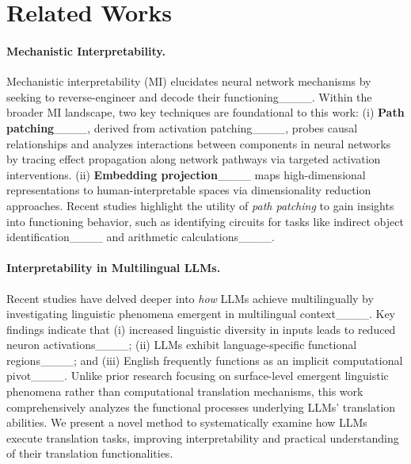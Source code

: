 \section{Related Works}
\paragraph{Mechanistic Interpretability.}
Mechanistic interpretability (MI) elucidates neural network mechanisms by seeking to reverse-engineer and decode their functioning____.
Within the broader MI landscape, two key techniques are foundational to this work: (i) \textbf{Path patching}____, derived from activation patching____, probes causal relationships and analyzes interactions between components in neural networks by tracing effect propagation along network pathways via targeted activation interventions.
(ii) \textbf{Embedding projection}____ maps high-dimensional representations to human-interpretable spaces via dimensionality reduction approaches. 
Recent studies highlight the utility of \textit{path patching} to gain insights into functioning behavior, such as identifying circuits for tasks like indirect object identification____ and arithmetic calculations____.


\paragraph{Interpretability in Multilingual LLMs.}

Recent studies have delved deeper into \textit{how} LLMs achieve multilingually by investigating linguistic phenomena emergent in multilingual context____. Key findings indicate that (i) increased linguistic diversity in inputs leads to reduced neuron activations____; (ii) LLMs exhibit language-specific functional regions____; and (iii) English frequently functions as an implicit computational pivot____. 
Unlike prior research focusing on surface-level emergent linguistic phenomena rather than computational translation mechanisms, this work comprehensively analyzes the functional processes underlying LLMs’ translation abilities. We present a novel method to systematically examine how LLMs execute translation tasks, improving interpretability and practical understanding of their translation functionalities.